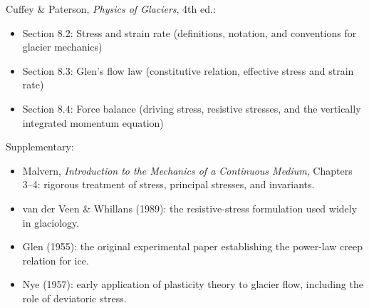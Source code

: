 \documentclass[11pt]{article}
\begin{document}
Cuffey \& Paterson, \textit{Physics of Glaciers}, 4th ed.:
\begin{itemize}
  \item Section 8.2: Stress and strain rate (definitions, notation, and conventions for glacier mechanics)
  \item Section 8.3: Glen's flow law (constitutive relation, effective stress and strain rate)
  \item Section 8.4: Force balance (driving stress, resistive stresses, and the vertically integrated momentum equation)
\end{itemize}

\noindent Supplementary:
\begin{itemize}
  \item Malvern, \textit{Introduction to the Mechanics of a Continuous Medium}, Chapters 3--4: rigorous treatment of stress, principal stresses, and invariants.
  \item van der Veen \& Whillans (1989): the resistive-stress formulation used widely in glaciology.
  \item Glen (1955): the original experimental paper establishing the power-law creep relation for ice.
  \item Nye (1957): early application of plasticity theory to glacier flow, including the role of deviatoric stress.
\end{itemize}



\end{document}
